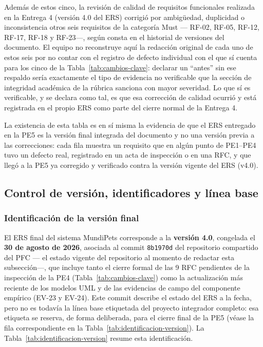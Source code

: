 \documentclass[journal,onecolumn]{IEEEtran}
\begin{document}
Además de estos cinco, la revisión de calidad de requisitos funcionales
realizada en la Entrega 4 (versión 4.0 del ERS) corrigió por ambigüedad,
duplicidad o inconsistencia otros seis requisitos de la categoría Must ---
RF-02, RF-05, RF-12, RF-17, RF-18 y RF-23---, según consta en el historial de
versiones del documento. El equipo no reconstruye aquí la redacción original
de cada uno de estos seis por no contar con el registro de defecto
individual con el que sí cuenta para los cinco de la Tabla~\ref{tab:cambios-clave}:
declarar un ``antes'' sin ese respaldo sería exactamente el tipo de
evidencia no verificable que la sección de integridad académica de la
rúbrica sanciona con mayor severidad. Lo que sí es verificable, y se declara
como tal, es que esa corrección de calidad ocurrió y está registrada en el
propio ERS como parte del cierre normal de la Entrega 4.

La existencia de esta tabla es en sí misma la evidencia de que el ERS
entregado en la PE5 es la versión final integrada del documento y no una
versión previa a las correcciones: cada fila muestra un requisito que en
algún punto de PE1--PE4 tuvo un defecto real, registrado en un acta de
inspección o en una RFC, y que llegó a la PE5 ya corregido y verificado
contra la versión vigente del ERS (v4.0).

\subsection{Control de versión, identificadores y línea base}
\label{sec:control-version}

\subsubsection{Identificación de la versión final}

El ERS final del sistema MundiPets corresponde a la \textbf{versión 4.0}, congelada
el \textbf{30 de agosto de 2026}, asociada al commit \texttt{8b1970d} del
repositorio compartido del PFC --- el estado vigente del repositorio al
momento de redactar esta subsección---, que incluye tanto el cierre formal de
las 9 RFC pendientes de la inspección de la PE4 (Tabla~\ref{tab:cambios-clave})
como la actualización más reciente de los modelos UML y de las evidencias de
campo del componente empírico (EV-23 y EV-24). Este commit describe el estado
del ERS a la fecha, pero no es todavía la línea base etiquetada del proyecto
integrador completo: esa etiqueta se reserva, de forma deliberada, para el
cierre final de la PE5 (véase la fila correspondiente en la
Tabla~\ref{tab:identificacion-version}). La Tabla~\ref{tab:identificacion-version}
resume esta identificación.
\end{document}
